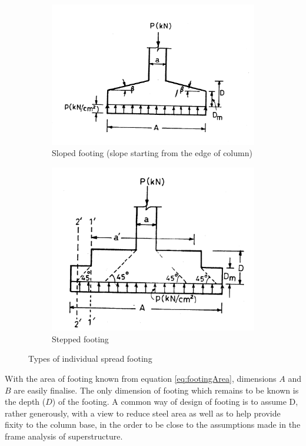 \documentclass{report}
\begin{document}
\begin{figure}
\begin{subfigure}[b]{0.5\textwidth}
    \includegraphics[width=\textwidth]{images/fig2293.png}
    \caption{Sloped footing (slope starting from the edge of column)}
    \label{fig:2}
  \end{subfigure}
\begin{subfigure}[b]{0.5\textwidth}
    \includegraphics[width=\textwidth]{images/fig2294.png}
    \caption{Stepped footing}
    \label{fig:2}
  \end{subfigure}
\caption{Types of individual spread footing}
\end{figure}


With the area of footing known from equation \ref{eq:footingArea},
dimensions $A$ and $B$ are easily finalise.  The only dimension of footing
which remains to be known is the depth ($D$) of the footing.  A common way
of design of footing is to assume D, rather generously, with a view to
reduce steel area as well as to help provide fixity to the column base, in
the order to be close to the assumptions made in the frame analysis of
superstructure.
\end{document}
